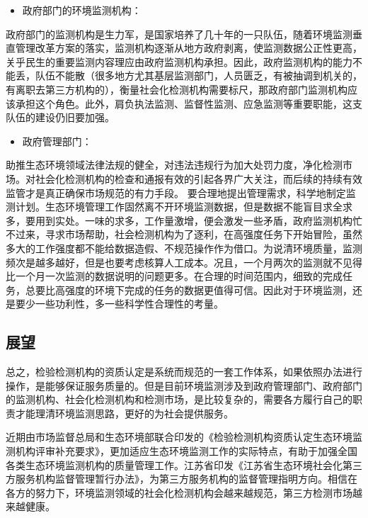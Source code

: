 \documentclass[]{book}
\providecommand{\tightlist}{%
  \setlength{\itemsep}{0pt}\setlength{\parskip}{0pt}}
\begin{document}
\begin{itemize}
\tightlist
\item
  政府部门的环境监测机构：
\end{itemize}

政府部门的监测机构是生力军，是国家培养了几十年的一只队伍，随着环境监测垂直管理改革方案的落实，监测机构逐渐从地方政府剥离，使监测数据公正性更高，关乎民生的重要监测内容理应由政府监测机构承担。因此，政府监测机构的能力不能丢，队伍不能散（很多地方尤其基层监测部门，人员匮乏，有被抽调到机关的，有离职去第三方机构的），衡量社会化检测机构需要标尺，那政府部门监测机构应该承担这个角色。此外，肩负执法监测、监督性监测、应急监测等重要职能，这支队伍的建设仍旧要加强。

\begin{itemize}
\tightlist
\item
  政府管理部门：
\end{itemize}

助推生态环境领域法律法规的健全，对违法违规行为加大处罚力度，净化检测市场。对社会化检测机构的检查和通报有效的引起各界广大关注，而后续的持续有效监管才是真正确保市场规范的有力手段。
要合理地提出管理需求，科学地制定监测计划。生态环境管理工作固然离不开环境监测数据，但是数据不能盲目求全求多，要用到实处。一味的求多，工作量激增，便会激发一些矛盾，政府监测机构忙不过来，寻求市场帮助，社会检测机构为了逐利，在高强度任务下开始冒险，虽然多大的工作强度都不能给数据造假、不规范操作作为借口。为说清环境质量，监测频次是越多越好，但是也要考虑核算人工成本。况且，一个月两次的监测就不见得比一个月一次监测的数据说明的问题更多。在合理的时间范围内，细致的完成任务，总要比高强度的环境下完成的任务的数据更值得可信。因此对于环境监测，还是要少一些功利性，多一些科学性合理性的考量。

\hypertarget{ux5c55ux671b}{%
\subsection{展望}\label{ux5c55ux671b}}

总之，检验检测机构的资质认定是系统而规范的一套工作体系，如果依照办法进行操作，是能够保证服务质量的。但是目前环境监测涉及到政府管理部门、政府部门的监测机构、社会化检测机构和检测市场，是比较复杂的，需要各方履行自己的职责才能理清环境监测思路，更好的为社会提供服务。

近期由市场监督总局和生态环境部联合印发的《检验检测机构资质认定生态环境监测机构评审补充要求》，更加适应生态环境监测工作的实际特点，有助于加强全国各类生态环境监测机构的质量管理工作。江苏省印发《江苏省生态环境社会化第三方服务机构监督管理暂行办法》，为第三方服务机构的监督管理指明方向。相信在各方的努力下，环境监测领域的社会化检测机构会越来越规范，第三方检测市场越来越健康。
\end{document}
